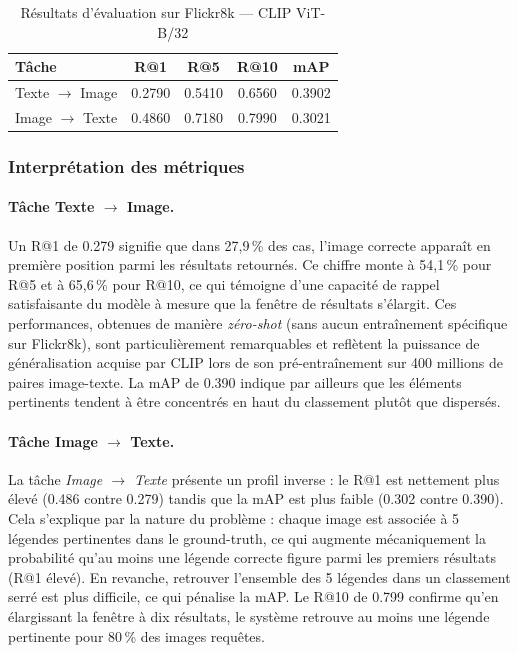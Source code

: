 \documentclass[a4paper,11pt]{article}
\begin{document}
\begin{table}[h]
\centering
\caption{Résultats d'évaluation sur Flickr8k — CLIP ViT-B/32}
\label{tab:clip_results}
\begin{tabular}{lcccc}
\hline
\textbf{Tâche} & \textbf{R@1} & \textbf{R@5} & \textbf{R@10} & \textbf{mAP} \\
\hline
Texte $\rightarrow$ Image & 0.2790 & 0.5410 & 0.6560 & 0.3902 \\
Image $\rightarrow$ Texte & 0.4860 & 0.7180 & 0.7990 & 0.3021 \\
\hline
\end{tabular}
\end{table}

 
\subsubsection{Interprétation des métriques}
 
\paragraph{Tâche Texte $\rightarrow$ Image.}
Un R@1 de 0.279 signifie que dans 27,9\,\% des cas, l'image correcte
apparaît en première position parmi les résultats retournés.
Ce chiffre monte à 54,1\,\% pour R@5 et à 65,6\,\% pour R@10, ce qui
témoigne d'une capacité de rappel satisfaisante du modèle à mesure que
la fenêtre de résultats s'élargit.
Ces performances, obtenues de manière \textit{zéro-shot} (sans aucun
entraînement spécifique sur Flickr8k), sont particulièrement
remarquables et reflètent la puissance de généralisation acquise
par CLIP lors de son pré-entraînement sur 400 millions de paires
image-texte.
La mAP de 0.390 indique par ailleurs que les éléments pertinents
tendent à être concentrés en haut du classement plutôt que dispersés.
 
\paragraph{Tâche Image $\rightarrow$ Texte.}
La tâche \textit{Image $\rightarrow$ Texte} présente un profil inverse :
le R@1 est nettement plus élevé (0.486 contre 0.279) tandis que
la mAP est plus faible (0.302 contre 0.390).
Cela s'explique par la nature du problème : chaque image est associée à
5 légendes pertinentes dans le ground-truth, ce qui augmente mécaniquement
la probabilité qu'au moins une légende correcte figure parmi les premiers
résultats (R@1 élevé).
En revanche, retrouver l'ensemble des 5 légendes dans un classement serré
est plus difficile, ce qui pénalise la mAP.
Le R@10 de 0.799 confirme qu'en élargissant la fenêtre à dix résultats,
le système retrouve au moins une légende pertinente pour 80\,\% des images
requêtes.
 
\end{document}
